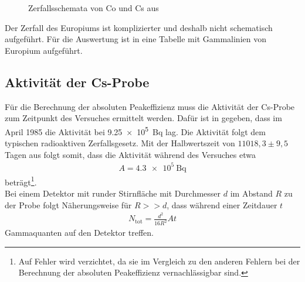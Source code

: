 \begin{figure}[h]
\begin{subfigure}[h]{0.4\textwidth}
  \end{subfigure}
  \caption{Zerfallsschemata von Co und Cs aus \cite{praktikumsheft}}
  \label{fig:schema}
\end{figure} 
   
Der Zerfall des Europiums ist komplizierter und deshalb nicht schematisch aufgeführt. Für die Auswertung ist in \cite{praktikumsheft} eine Tabelle mit Gammalinien von Europium aufgeführt.

\subsection{Aktivität der Cs-Probe}
Für die Berechnung der absoluten Peakeffizienz muss die Aktivität der Cs-Probe zum Zeitpunkt des Versuches ermittelt werden. Dafür ist in \cite{praktikumsheft} gegeben, dass im April 1985 die Aktivität bei \SI{9.25e5}{\becquerel} lag. Die Aktivität folgt dem typischen radioaktiven Zerfallsgesetz. Mit der Halbwertszeit von $11018,3 \pm 9,5$ Tagen aus \cite{lebensdauer} folgt somit, dass die Aktivität während des Versuches etwa 
\begin{align*}
  A=\SI{4.3e5}{\becquerel}
\end{align*}
beträgt\footnote{Auf Fehler wird verzichtet, da sie im Vergleich zu den anderen Fehlern bei der Berechnung der absoluten Peakeffizienz vernachlässigbar sind.}.\\

Bei einem Detektor mit runder Stirnfläche mit Durchmesser $d$ im Abstand $R$ zu der Probe folgt Näherungsweise für $R>>d$, dass während einer Zeitdauer $t$
\begin{align}
  N_\mathrm{tot}= \frac{d^2}{16 R^2}At
  \label{eq:ntot}
\end{align}
Gammaquanten auf den Detektor treffen.

